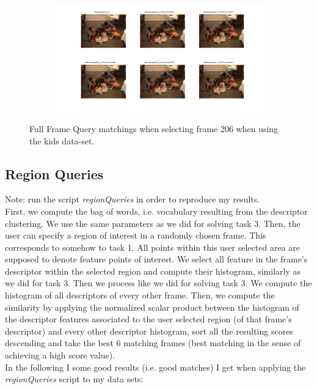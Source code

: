 \documentclass{paper}
\begin{document}
\begin{figure}[H]
\centering
\begin{subfigure}{1.0\textwidth}
\includegraphics[width=\textwidth]{figures/full_frame_queries/kids/fullQueries206}
\end{subfigure}
\caption{Full Frame Query matchings when selecting frame 206 when using the kids data-set.}
\label{fig:kids_fullquery_2}
\end{figure}

\subsection{Region Queries}
Note: run the script \emph{regionQueries} in order to reproduce my results. \\

First, we compute the bag of words, i.e. vocabulary resulting from the descriptor clustering. We use the same parameters as we did for solving task 3. Then, the user can specify a region of interest in a randomly chosen frame. This corresponds to somehow to task 1. All points within this user selected area are supposed to denote feature points of interest. We select all feature in the frame's descriptor within the selected region and compute their histogram, similarly as we did for task 3. Then we process like we did for solving task 3. We compute the histogram of all descriptors of every other frame. Then, we compute the similarity by applying the normalized scalar product between the histogram of the descriptor features associated to the user selected region (of that frame's descriptor) and every other descriptor histogram, sort all the resulting scores descending and take the best 6 matching frames (best matching in the sense of achieving a high score value). \\

In the following I some good results (i.e. good matches) I get when applying the \emph{regionQueries} script to my data sets:
\end{document}
